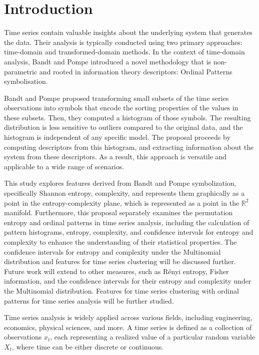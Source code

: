 \chapter{Introduction}\label{C:intro}

Time series contain valuable insights about the underlying system that generates the data. 
Their analysis is typically conducted using two primary approaches: time-domain and transformed-domain methods. 
In the context of time-domain analysis, Bandt and Pompe \cite{PhysRevLett.88.174102} introduced a novel methodology that is non-parametric and rooted in information theory descriptors: Ordinal Patterns symbolisation. 

Bandt and Pompe \cite{PhysRevLett.88.174102} proposed transforming small subsets of the time series observations into symbols that encode the sorting properties of the values in these subsets.
Then, they computed a histogram of those symbols.
The resulting distribution is less sensitive to outliers compared to the original data, and the histogram is independent of any specific model.
The proposal proceeds by computing descriptors from this histogram, and extracting information about the system from these descriptors.
As a result, this approach is versatile and applicable to a wide range of scenarios.  

This study explores features derived from Bandt and Pompe symbolization, specifically Shannon entropy, complexity, and represents them graphically as a point in the entropy-complexity plane, which is represented as a point in the $\mathbb{R}^2$ manifold. 
Furthermore, this proposal separately examines the permutation entropy and ordinal patterns in time series analysis, including the calculation of pattern histograms, entropy, complexity, and confidence intervals for entropy and complexity to enhance the understanding of their statistical properties. 
The confidence intervals for entropy and complexity under the Multinomial distribution and features for time series clustering will be discussed further. 
Future work will extend to other measures, such as Rényi entropy, Fisher information, and the confidence intervals for their entropy and complexity under the Multinomial distribution. Features for time series clustering with ordinal patterns for time series analysis will be further studied.

Time series analysis is widely applied across various fields, including engineering, economics, physical sciences, and more. A time series is defined as a collection of observations ${x_t}$, each representing a realized value of a particular random variable $X_t$, where time can be either discrete or continuous.

